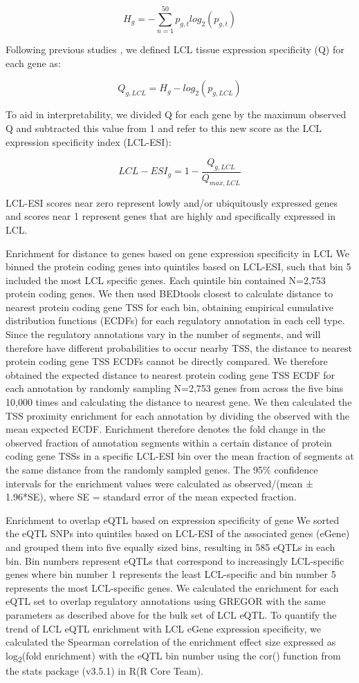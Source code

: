 \[ H_g = -\sum_{n=1}^{50}p_{g,t} log_2(p_{g,t}) \]

Following previous studies \cite{schugPromoterFeaturesRelated2005, heGlobalViewEnhancer2014}, we defined LCL tissue expression specificity (Q) for each gene as:

\[ Q_{g, LCL} = H_g - log_2(p_{g, LCL}) \]

To aid in interpretability, we divided Q for each gene by the maximum observed Q and subtracted this value from 1 and refer to this new score as the LCL expression specificity index (LCL-ESI):

\[ LCL-ESI_g = 1 - \frac{Q_{g, LCL}}{Q_{max, LCL}} \]
 
LCL-ESI scores near zero represent lowly and/or ubiquitously expressed genes and scores near 1 represent genes that are highly and specifically expressed in LCL. 

Enrichment for distance to genes based on gene expression specificity in LCL
We binned the protein coding genes into quintiles based on LCL-ESI, such that bin 5 included the most LCL specific genes. Each quintile bin contained N=2,753 protein coding genes. We then used BEDtools closest to calculate distance to nearest protein coding gene TSS for each bin, obtaining empirical cumulative distribution functions (ECDFs) for each regulatory annotation in each cell type. Since the regulatory annotations vary in the number of segments, and will therefore have different probabilities to occur nearby TSS, the distance to nearest protein coding gene TSS ECDFs cannot be directly compared. We therefore obtained the expected distance to nearest protein coding gene TSS ECDF for each annotation by randomly sampling N=2,753 genes from across the five bins 10,000 times and calculating the distance to nearest gene. We then calculated the TSS proximity enrichment for each annotation by dividing the observed with the mean expected ECDF. Enrichment therefore denotes the fold change in the observed fraction of annotation segments within a certain distance of protein coding gene TSSs in a specific LCL-ESI bin over the mean fraction of segments at the same distance from the randomly sampled genes. The 95\% confidence intervals for the enrichment values were calculated as observed/(mean ± 1.96*SE), where SE = standard error of the mean expected fraction. 

Enrichment to overlap eQTL based on expression specificity of gene
We sorted the eQTL SNPs into quintiles based on LCL-ESI of the associated genes (eGene) and grouped them into five equally sized bins, resulting in 585 eQTLs in each bin. Bin numbers represent eQTLs that correspond to increasingly LCL-specific genes where bin number 1 represents the least LCL-specific and bin number 5 represents the most LCL-specific genes. We calculated the enrichment for each eQTL set to overlap regulatory annotations using GREGOR with the same parameters as described above for the bulk set of LCL eQTL. To quantify the trend of LCL eQTL enrichment with LCL eGene expression specificity, we calculated the Spearman correlation of the enrichment effect size expressed as log\textsubscript{2}(fold enrichment) with the eQTL bin number using the cor() function from the stats package (v3.5.1) in R(R Core Team).

